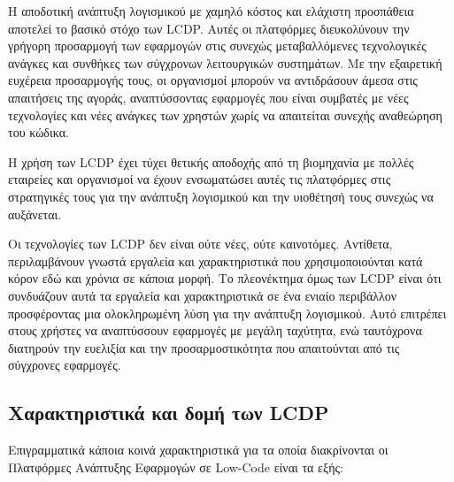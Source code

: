         Η αποδοτική ανάπτυξη λογισμικού με χαμηλό κόστος και ελάχιστη προσπάθεια αποτελεί το βασικό στόχο των LCDP. Αυτές οι πλατφόρμες διευκολύνουν την γρήγορη προσαρμογή των εφαρμογών στις συνεχώς μεταβαλλόμενες τεχνολογικές ανάγκες και συνθήκες των σύγχρονων λειτουργικών συστημάτων. Με την εξαιρετική ευχέρεια προσαρμογής τους, οι οργανισμοί μπορούν να αντιδράσουν άμεσα στις απαιτήσεις της αγοράς, αναπτύσσοντας εφαρμογές που είναι συμβατές με νέες τεχνολογίες και νέες ανάγκες των χρηστών χωρίς να απαιτείται συνεχής αναθεώρηση του κώδικα.

        Η χρήση των LCDP έχει τύχει θετικής αποδοχής από τη βιομηχανία με πολλές εταιρείες και οργανισμοί να έχουν ενσωματώσει αυτές τις πλατφόρμες στις στρατηγικές τους για την ανάπτυξη λογισμικού και την υιοθέτησή τους συνεχώς να αυξάνεται. \cite{Bock2021,Bucaioni2022,Sahay2020}

        Οι τεχνολογίες των LCDP δεν είναι ούτε νέες, ούτε καινοτόμες. Αντίθετα, περιλαμβάνουν γνωστά εργαλεία και χαρακτηριστικά που χρησιμοποιούνται κατά κόρον εδώ και χρόνια σε κάποια μορφή. Το πλεονέκτημα όμως των LCDP είναι ότι συνδυάζουν αυτά τα εργαλεία και χαρακτηριστικά σε ένα ενιαίο περιβάλλον προσφέροντας μια ολοκληρωμένη λύση για την ανάπτυξη λογισμικού. Αυτό επιτρέπει στους χρήστες να αναπτύσσουν εφαρμογές με μεγάλη ταχύτητα, ενώ ταυτόχρονα διατηρούν την ευελιξία και την προσαρμοστικότητα που απαιτούνται από τις σύγχρονες εφαρμογές.

        \subsection{Χαρακτηριστικά και δομή των LCDP}
            Επιγραμματικά κάποια κοινά χαρακτηριστικά για τα οποία διακρίνονται οι Πλατφόρμες Ανάπτυξης Εφαρμογών σε Low-Code είναι τα εξής:


